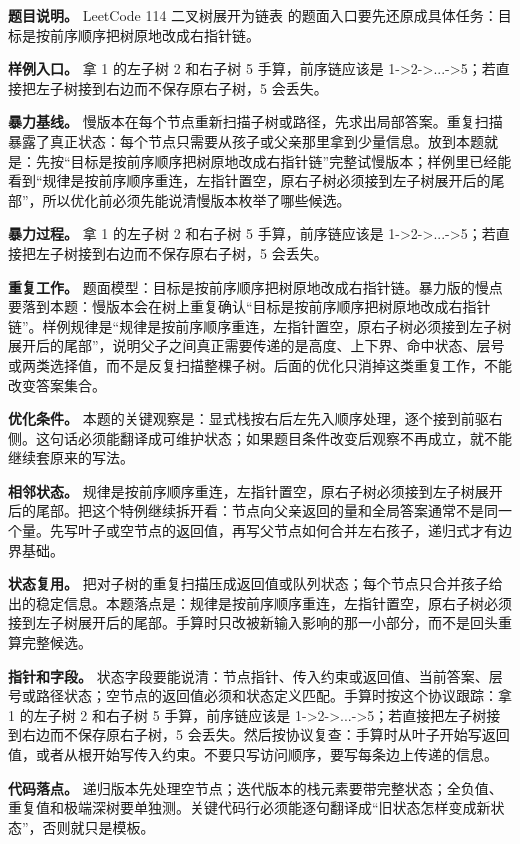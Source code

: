 \textbf{题目说明。} LeetCode 114 二叉树展开为链表 的题面入口要先还原成具体任务：目标是按前序顺序把树原地改成右指针链。

\textbf{样例入口。} 拿 1 的左子树 2 和右子树 5 手算，前序链应该是 1->2->...->5；若直接把左子树接到右边而不保存原右子树，5 会丢失。

\textbf{暴力基线。} 慢版本在每个节点重新扫描子树或路径，先求出局部答案。重复扫描暴露了真正状态：每个节点只需要从孩子或父亲那里拿到少量信息。放到本题就是：先按“目标是按前序顺序把树原地改成右指针链”完整试慢版本；样例里已经能看到“规律是按前序顺序重连，左指针置空，原右子树必须接到左子树展开后的尾部”，所以优化前必须先能说清慢版本枚举了哪些候选。

\textbf{暴力过程。} 拿 1 的左子树 2 和右子树 5 手算，前序链应该是 1->2->...->5；若直接把左子树接到右边而不保存原右子树，5 会丢失。

\textbf{重复工作。} 题面模型：目标是按前序顺序把树原地改成右指针链。暴力版的慢点要落到本题：慢版本会在树上重复确认“目标是按前序顺序把树原地改成右指针链”。样例规律是“规律是按前序顺序重连，左指针置空，原右子树必须接到左子树展开后的尾部”，说明父子之间真正需要传递的是高度、上下界、命中状态、层号或两类选择值，而不是反复扫描整棵子树。后面的优化只消掉这类重复工作，不能改变答案集合。

\textbf{优化条件。} 本题的关键观察是：显式栈按右后左先入顺序处理，逐个接到前驱右侧。这句话必须能翻译成可维护状态；如果题目条件改变后观察不再成立，就不能继续套原来的写法。

\textbf{相邻状态。} 规律是按前序顺序重连，左指针置空，原右子树必须接到左子树展开后的尾部。把这个特例继续拆开看：节点向父亲返回的量和全局答案通常不是同一个量。先写叶子或空节点的返回值，再写父节点如何合并左右孩子，递归式才有边界基础。

\textbf{状态复用。} 把对子树的重复扫描压成返回值或队列状态；每个节点只合并孩子给出的稳定信息。本题落点是：规律是按前序顺序重连，左指针置空，原右子树必须接到左子树展开后的尾部。手算时只改被新输入影响的那一小部分，而不是回头重算完整候选。

\textbf{指针和字段。} 状态字段要能说清：节点指针、传入约束或返回值、当前答案、层号或路径状态；空节点的返回值必须和状态定义匹配。手算时按这个协议跟踪：拿 1 的左子树 2 和右子树 5 手算，前序链应该是 1->2->...->5；若直接把左子树接到右边而不保存原右子树，5 会丢失。然后按协议复查：手算时从叶子开始写返回值，或者从根开始写传入约束。不要只写访问顺序，要写每条边上传递的信息。

\textbf{代码落点。} 递归版本先处理空节点；迭代版本的栈元素要带完整状态；全负值、重复值和极端深树要单独测。关键代码行必须能逐句翻译成“旧状态怎样变成新状态”，否则就只是模板。

